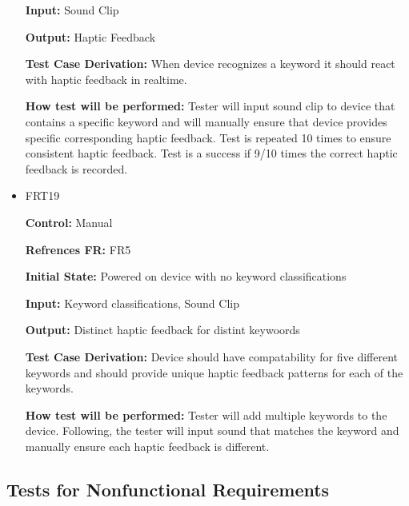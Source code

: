 \documentclass[12pt, titlepage]{article}
\begin{document}
\begin{itemize}
\textbf{Input:} Sound Clip
					
\textbf{Output:} Haptic Feedback

\textbf{Test Case Derivation:} When device recognizes a keyword it should react with haptic feedback in realtime.
					
\textbf{How test will be performed:} Tester will input sound clip to device that contains a specific keyword and will manually ensure that device provides specific corresponding haptic feedback. Test is repeated 10 times to ensure consistent haptic feedback. Test is a success if 9/10 times the correct haptic feedback is recorded.


\item{FRT19}

\textbf{Control:} Manual

\textbf{Refrences FR:} FR5 					

\textbf{Initial State:} Powered on device with no keyword classifications
					
\textbf{Input:} Keyword classifications, Sound Clip
					
\textbf{Output:} Distinct haptic feedback for distint keywoords

\textbf{Test Case Derivation:} Device should have compatability for five different keywords and should provide unique haptic feedback patterns for each of the keywords.
					
\textbf{How test will be performed:} Tester will add multiple keywords to the device. Following, the tester will input sound that matches the keyword and manually ensure each haptic feedback is different.


\end{itemize}

\subsection{Tests for Nonfunctional Requirements}
\end{document}
